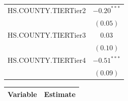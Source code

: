 \documentclass[12pt,english]{report}
\begin{document}
\begin{table}
\begin{center}
\begin{minipage}{0.4\textwidth}
{\begin{tabular}{l c }
HS.COUNTY.TIERTier2             & $-0.20^{***}$ \\
                                & $(0.05)$      \\
HS.COUNTY.TIERTier3             & $0.03$        \\
                                & $(0.10)$      \\    
                                      
HS.COUNTY.TIERTier4             & $-0.51^{***}$ \\
                                & $(0.09)$      \\ 
\hline                     
\end{tabular}}

\end{minipage} \hfil
\begin{minipage}{0.4\textwidth}
 \scalebox{0.9}
 {   
\begin{tabular}  {l c }    
\hline
Variable & Estimate   \\
\hline
                                                           

\end{tabular}}
\end{minipage}
\end{center}
\end{table}
\end{document}
